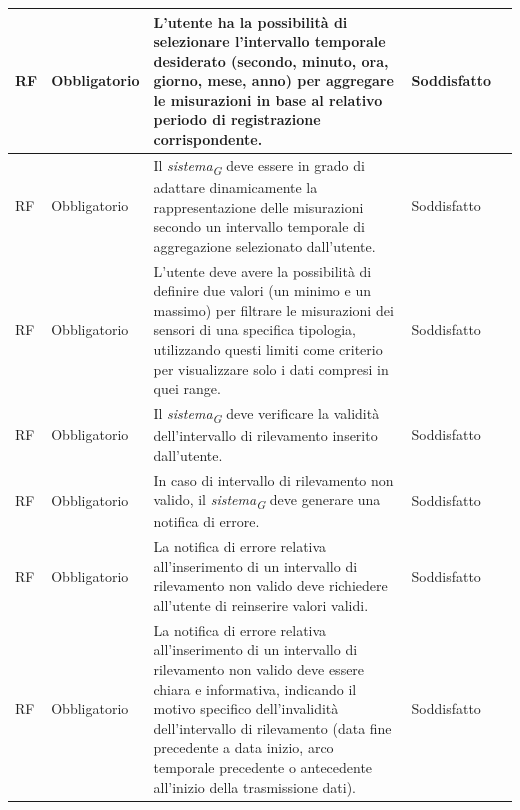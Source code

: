 \begin{longtable}{|C{1.5cm}|C{2cm}|L{5cm}|C{2cm}|C{1.5cm}|}
    \hline
     RF & Obbligatorio & L'utente ha la possibilità di selezionare l'intervallo temporale desiderato (secondo, minuto, ora, giorno, mese, anno) per aggregare le misurazioni in base al relativo periodo di registrazione corrispondente.& Soddisfatto \\
    
    \hline
     RF & Obbligatorio & Il \textit{sistema}\textsubscript{\textit{G}} deve essere in grado di adattare dinamicamente la rappresentazione delle misurazioni secondo un intervallo temporale di aggregazione selezionato dall'utente.& Soddisfatto \\
    
    \hline
     RF & Obbligatorio &  L'utente deve avere la possibilità di definire due valori (un minimo e un massimo) per filtrare le misurazioni dei sensori di una specifica tipologia, utilizzando questi limiti come criterio per visualizzare solo i dati compresi in quei range.& Soddisfatto \\
    
    \hline
     RF & Obbligatorio & Il \textit{sistema}\textsubscript{\textit{G}} deve verificare la validità dell'intervallo di rilevamento inserito dall'utente.& Soddisfatto \\
    
    \hline
     RF & Obbligatorio & In caso di intervallo di rilevamento non valido, il \textit{sistema}\textsubscript{\textit{G}} deve generare una notifica di errore.& Soddisfatto \\
    
    \hline
     RF & Obbligatorio & La notifica di errore relativa all'inserimento di un intervallo di rilevamento non valido deve richiedere all'utente di reinserire valori validi.& Soddisfatto \\
    
    \hline
     RF & Obbligatorio & La notifica di errore relativa all'inserimento di un intervallo di rilevamento non valido deve essere chiara e informativa, indicando il motivo specifico dell'invalidità dell'intervallo di rilevamento (data fine precedente a data inizio, arco temporale precedente o antecedente all'inizio della trasmissione dati).& Soddisfatto \\
    

\end{longtable}
